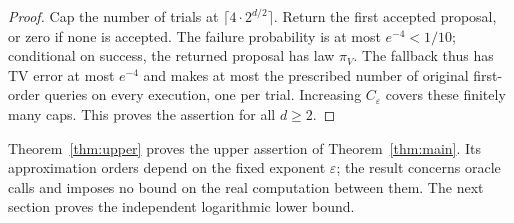 \begin{proof}
Cap the number of trials at $\lceil4\cdot2^{d/2}\rceil$.
Return the first accepted proposal, or zero if none is accepted.
The failure probability is at most $e^{-4}<1/10$; conditional on
success, the returned proposal has law $\pi_V$. The fallback thus
has TV error at most $e^{-4}$ and makes at most the prescribed
number of original first-order queries on every execution, one per
trial. Increasing $C_\varepsilon$ covers these finitely many caps.
This proves the assertion for all $d\ge2$.
\end{proof}

Theorem~\ref{thm:upper} proves the upper assertion of
Theorem~\ref{thm:main}. Its approximation orders depend on the fixed
exponent $\varepsilon$; the result concerns oracle calls and imposes
no bound on the real computation between them. The next section
proves the independent logarithmic lower bound.
